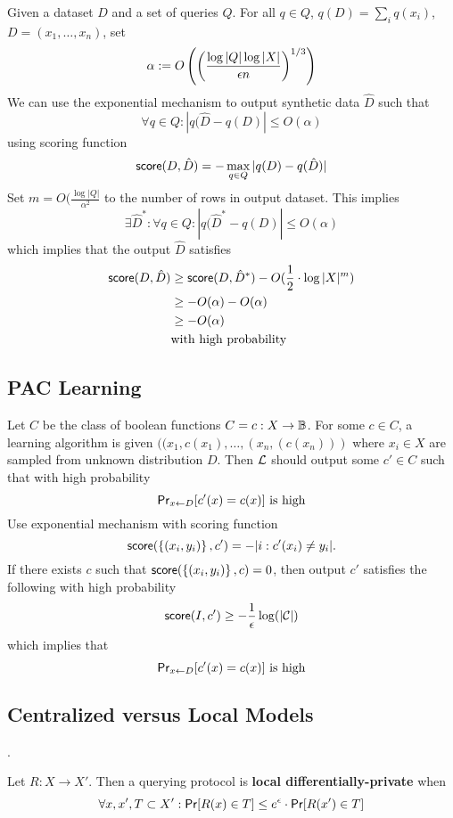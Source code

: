 Given a dataset $D$ and a set of queries $Q$.
For all $q \in Q$, $q(D) = \sum_i q(x_i)$, $D = (x_1, \dots, x_n)$,
set 
\[
    \alpha := O\left(
        \left(
            \frac
                {\log |Q| \log|X|}
                {\epsilon n}
        \right)^{1/3}
    \right)
\]
We can use the exponential mechanism to output synthetic data $\hat{D}$ such that
\[
    \forall q \in Q:
    |q(\hat{D} - q(D)| \leq O(\alpha)
\]
using scoring function
\[
    \mathsf{score}(D, \hat{D}) = -\max_{q \in Q}|q(D) - q(\hat{D})|
\]
Set $m = O(\frac{\log|Q|}{\alpha^2}$ to the number of rows in output dataset.
This implies
\[
    \exists \hat{D}^*:
    \forall q \in Q:
    |q(\hat{D}^* - q(D)| \leq O(\alpha)
\]
which implies that the output $\hat{D}$ satisfies
\begin{align*}
    \mathsf{score}(D, \hat{D})
    &\geq 
    \mathsf{score}(D, \hat{D}^*) - O(\frac{1}{2} \cdot \log|X|^m) 
    \\ &\geq
    -O(\alpha) - O(\alpha)
    \\ &\geq 
    -O(\alpha)
    \\ &\text{with high probability}
\end{align*}

\subsection{PAC Learning}

Let $C$ be the class of boolean functions $C = {c : X \to \mathbb{B}}$.
For some $c \in C$, a learning algorithm is given 
$((x_1, c(x_1), \dots, (x_n, (c(x_n)))$
where $x_i \in X$ are sampled from unknown distribution $D$.
Then $\mathcal{L}$ should output some $c' \in C$ such that with high probability
\[
    \mathsf{Pr}_{x \gets D}[c'(x) = c(x)]~\text{is high}
\]
Use exponential mechanism with scoring function
\[
    \mathsf{score}(\left\{(x_i, y_i)\right\}, c') =
    -|i : c'(x_i) \neq y_i|.
\]
If there exists $c$ such that $\mathsf{score}(\left\{(x_i, y_i)\right\}, c) = 0$,
then output $c'$ satisfies the following with high probability
\[
    \mathsf{score}(I, c') \geq -\frac{1}{\epsilon}\log(|\mathcal{C}|)
\]
which implies that 
\[
    \mathsf{Pr}_{x \gets D}[c'(x) = c(x)]~\text{is high}
\]

\subsection{Centralized versus Local Models}.


\begin{defn}
Let $R : X \to X'$.
Then a querying protocol is \textbf{local differentially-private} when
\[
    \forall x, x', T \subset X':
    \mathsf{Pr}[R(x) \in T] \leq e^\epsilon \cdot \mathsf{Pr}[R(x') \in T]
\]
\end{defn}

